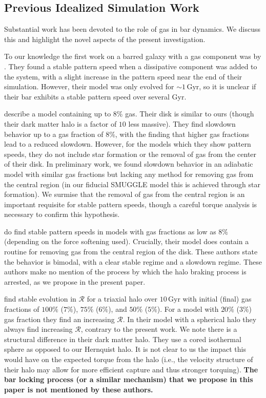 \documentclass[twocolumn,linenumbers,trackchanges]{aastex631}
\newcommand{\Rot}{\ensuremath{\mathcal{R}}}
\begin{document}
\subsection{Previous Idealized Simulation Work}
Substantial work has been devoted to the role of gas in bar dynamics. We
discuss this and highlight the novel aspects of the present investigation.

To our knowledge the first work on a barred galaxy with a gas component was
by \citet{1993AA...268...65F}. They found a stable pattern speed when a
dissipative component was added to the system, with a slight increase in the
pattern speed near the end of their simulation. However, their model was only
evolved for $\sim1\,\textrm{Gyr}$, so it is unclear if their bar exhibits a
stable pattern speed over several Gyr.

\citet{2007ApJ...666..189B} describe a model containing up to $8\%$ gas.
Their disk is similar to ours (though their dark matter halo is a factor of $10$
less massive). They find slowdown behavior up to a gas fraction of $8\%$, with
the finding that higher gas fractions lead to a reduced slowdown. However, for
the models which they show pattern speeds, they do not include star formation or
the removal of gas from the center of their disk. In preliminary work, we found
slowdown behavior in an adiabatic model with similar gas fractions but lacking
any method for removing gas from the central region (in our fiducial SMUGGLE
model this is achieved through star formation). We surmise that the removal of
gas from the central region is an important requisite for stable pattern speeds,
though a careful torque analysis is necessary to confirm this hypothesis.

\citet{2010ApJ...719.1470V} do find stable pattern speeds in models with
gas fractions as low as $8\%$ (depending on the force softening used).
Crucially, their model does contain a routine for removing gas from the central
region of the disk. These authors state the behavior is bimodal, with a clear
stable regime and a slowdown regime. These authors make no mention of the
process by which the halo braking process is arrested, as we propose in the
present paper.

\citet{2013MNRAS.429.1949A, 2014MNRAS.438L..81A} find stable evolution in \Rot{}
for a triaxial halo over $10\,\textrm{Gyr}$ with initial (final) gas fractions
of $100\%$ ($7\%$), $75\%$ ($6\%$), and $50\%$ ($5\%$). For a model with $20\%$
($3\%$) gas fraction they find an increasing \Rot{}. In their model with a
spherical halo they always find increasing \Rot{}, contrary to the present work.
We note there is a structural difference in their dark matter halo. They use a
cored isothermal sphere as opposed to our Hernquist halo. It is not clear to us
the impact this would have on the expected torque from the halo (i.e., the
velocity structure of their halo may allow for more efficient capture and thus
stronger torquing). {\bf The bar locking process (or a similar mechanism) that
we propose in this paper is not mentioned by these authors.}
\end{document}
